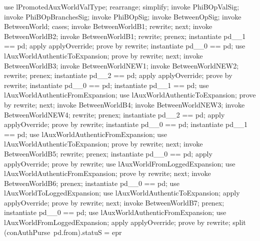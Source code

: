 \begin{LPScript}\begin{zproof}[lPromotedBetweenWorldValType]
    use lPromotedAuxWorldValType;
    rearrange;
    simplify;
    invoke PhiBOpValSig;
    invoke PhiBOpBranchesSig;
    invoke PhiBOpSig;
    invoke BetweenOpSig;
    invoke BetweenWorld;
    cases;
        invoke BetweenWorldB1;
        rewrite;
    next;
        invoke BetweenWorldB2;
        invoke BetweenWorldB1;
        rewrite;
        prenex;
        instantiate pd\_\_1 == pd;
        apply applyOverride;
        prove by rewrite;
        instantiate pd\_\_0 == pd;
        use lAuxWorldAuthenticToExpansion;
        prove by rewrite;
    next;
        invoke BetweenWorldB3;
        invoke BetweenWorldNEW1;
        invoke BetweenWorldNEW2;
        rewrite;
        prenex;
        instantiate pd\_\_2 == pd;
        apply applyOverride;
        prove by rewrite;
        instantiate pd\_\_0 == pd;
        instantiate pd\_\_1 == pd;
        use lAuxWorldAuthenticFromExpansion;
        use lAuxWorldAuthenticToExpansion;
        prove by rewrite;
    next;
        invoke BetweenWorldB4;
        invoke BetweenWorldNEW3;
        invoke BetweenWorldNEW4;
        rewrite;
        prenex;
        instantiate pd\_\_2 == pd;
        apply applyOverride;
        prove by rewrite;
        instantiate pd\_\_0 == pd;
        instantiate pd\_\_1 == pd;
        use lAuxWorldAuthenticFromExpansion;
        use lAuxWorldAuthenticToExpansion;
        prove by rewrite;
    next;
        invoke BetweenWorldB5;
        rewrite;
        prenex;
        instantiate pd\_\_0 == pd;
        apply applyOverride;
        prove by rewrite;
        use lAuxWorldFromLoggedExpansion;
        use lAuxWorldAuthenticFromExpansion;
        prove by rewrite;
    next;
        invoke BetweenWorldB6;
        prenex;
        instantiate pd\_\_0 == pd;
        use lAuxWorldToLoggedExpansion;
        use lAuxWorldAuthenticToExpansion;
        apply applyOverride;
        prove by rewrite;
    next;
        invoke BetweenWorldB7;
        prenex;
        instantiate pd\_\_0 == pd;
        use lAuxWorldAuthenticFromExpansion;
        use lAuxWorldFromLoggedExpansion;
        apply applyOverride;
        prove by rewrite;
        split (conAuthPurse~pd.from).statuS = epr

\end{zproof}
\end{LPScript}
